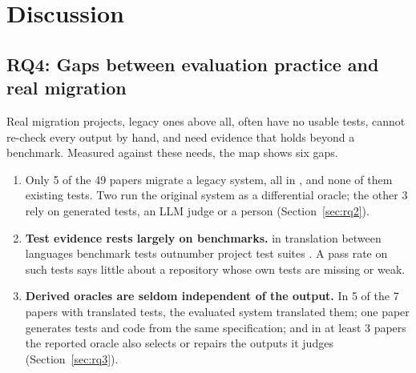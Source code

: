 \section{Discussion}
\label{sec:discussion}

\begin{added}
\subsection{RQ4: Gaps between evaluation practice and real migration}
\label{sec:rq4}

Real migration projects, legacy ones above all, often have no usable tests, cannot re-check every output by hand, and need evidence that holds beyond a benchmark. Measured against these needs, the map shows six gaps.
\begin{enumerate}[label=\textbf{G\arabic*.}]
  \item \textbf{} Only 5 of the 49 papers migrate a legacy system, all in , and none of them  existing tests. Two run the original system as a differential oracle; the other 3 rely on generated tests, an LLM judge or a person (Section~\ref{sec:rq2}). 
  \item \textbf{Test evidence rests largely on benchmarks.}  in translation between languages benchmark tests outnumber project test suites . A pass rate on such tests says little about a repository whose own tests are missing or weak.
  \item \textbf{Derived oracles are seldom independent of the output.} In 5 of the 7 papers with translated tests, the evaluated system translated them; one paper generates tests and code from the same specification; and in at least 3 papers the reported oracle also selects or repairs the outputs it judges (Section~\ref{sec:rq3}).

\end{enumerate}
\end{added}
